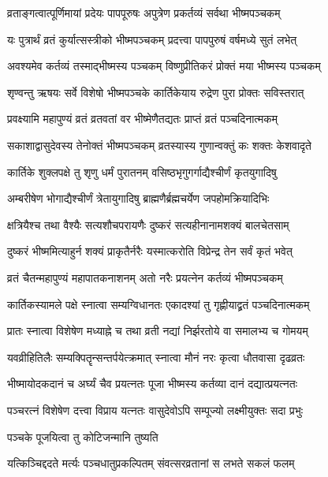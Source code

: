 \twolineshloka
{व्रताङ्गत्वात्पूर्णिमायां प्रदेयः पापपूरुषः}
{अपुत्रेण प्रकर्तव्यं सर्वथा भीष्मपञ्चकम्} %

\twolineshloka
{यः पुत्रार्थं व्रतं कुर्यात्सस्त्रीको भीष्मपञ्चकम्}
{प्रदत्त्वा पापपुरुषं वर्षमध्ये सुतं लभेत्} %

\twolineshloka
{अवश्यमेव कर्तव्यं तस्माद्भीष्मस्य पञ्चकम्}
{विष्णुप्रीतिकरं प्रोक्तं मया भीष्मस्य पञ्चकम्} %


\twolineshloka
{शृण्वन्तु ऋषयः सर्वे विशेषो भीष्मपञ्चके}
{कार्तिकेयाय रुद्रेण पुरा प्रोक्तः सविस्तरात्} %


\twolineshloka
{प्रवक्ष्यामि महापुण्यं व्रतं व्रतवतां वर}
{भीष्मेणैतद्यतः प्राप्तं व्रतं पञ्चदिनात्मकम्} %

\twolineshloka
{सकाशाद्वासुदेवस्य तेनोक्तं भीष्मपञ्चकम्}
{व्रतस्यास्य गुणान्वक्तुं कः शक्तः केशवादृते} %

\twolineshloka
{कार्तिके शुक्लपक्षे तु शृणु धर्मं पुरातनम्}
{वसिष्ठभृगुगर्गाद्यैश्चीर्णं कृतयुगादिषु} %

\twolineshloka
{अम्बरीषेण भोगाद्यैश्चीर्णं त्रेतायुगादिषु}
{ब्राह्मणैर्ब्रह्मचर्येण जपहोमक्रियादिभिः} %

\twolineshloka
{क्षत्रियैश्च तथा वैश्यैः सत्यशौचपरायणैः}
{दुष्करं सत्यहीनानामशक्यं बालचेतसाम्} %

\twolineshloka
{दुष्करं भीष्ममित्याहुर्न शक्यं प्राकृतैर्नरैः}
{यस्मात्करोति विप्रेन्द्र तेन सर्वं कृतं भवेत्} %

\twolineshloka
{व्रतं चैतन्महापुण्यं महापातकनाशनम्}
{अतो नरैः प्रयत्नेन कर्तव्यं भीष्मपञ्चकम्} %

\twolineshloka
{कार्तिकस्यामले पक्षे स्नात्वा सम्यग्विधानतः}
{एकादश्यां तु गृह्णीयाद्व्रतं पञ्चदिनात्मकम्} %

\twolineshloka
{प्रातः स्नात्वा विशेषेण मध्याह्ने च तथा व्रती}
{नद्यां निर्झरतोये वा समालभ्य च गोमयम्} %

\twolineshloka
{यवव्रीहितिलैः सम्यक्पितॄन्सन्तर्पयेत्क्रमात्}
{स्नात्वा मौनं नरः कृत्वा धौतवासा दृढव्रतः} %

\twolineshloka
{भीष्मायोदकदानं च अर्घ्यं चैव प्रयत्नतः}
{पूजा भीष्मस्य कर्तव्या दानं दद्यात्प्रयत्नतः} %

\twolineshloka
{पञ्चरत्नं विशेषेण दत्त्वा विप्राय यत्नतः}
{वासुदेवोऽपि सम्पूज्यो लक्ष्मीयुक्तः सदा प्रभुः} %


\onelineshloka
{पञ्चके पूजयित्वा तु कोटिजन्मानि तुष्यति} %

\twolineshloka
{यत्किञ्चिद्ददते मर्त्यः पञ्चधातुप्रकल्पितम्}
{संवत्सरव्रतानां स लभते सकलं फलम्} %

